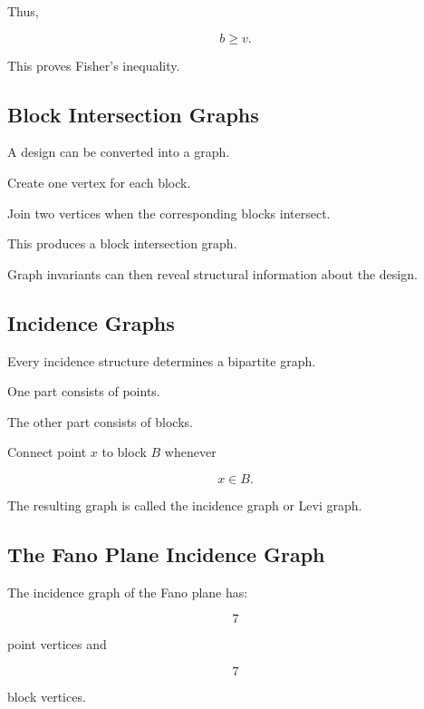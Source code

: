Thus,

\[
\boxed{
b\geq v.
}
\]

This proves Fisher's inequality.

\subsection{Block Intersection Graphs}
\label{subsec:block-intersection-graphs}

A design can be converted into a graph.

Create one vertex for each block.

Join two vertices when the corresponding blocks intersect.

This produces a block intersection graph.

Graph invariants can then reveal structural information about the
design.

\subsection{Incidence Graphs}
\label{subsec:design-incidence-graphs}

Every incidence structure determines a bipartite graph.

One part consists of points.

The other part consists of blocks.

Connect point \(x\) to block \(B\) whenever

\[
x\in B.
\]

The resulting graph is called the incidence graph or Levi graph.

\subsection{The Fano Plane Incidence Graph}
\label{subsec:fano-incidence-graph}

The incidence graph of the Fano plane has:

\[
7
\]

point vertices and

\[
7
\]

block vertices.

